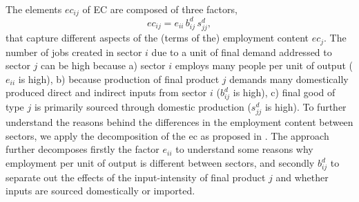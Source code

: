 \documentclass[12pt,english]{article}
\begin{document}
The elements $ec_{ij}$ of EC are composed of three factors, 
\begin{equation}ec_{ij} = e_{ii} \, b^d_{ij} \, s^d_{jj}, \label{EC_decomp}\end{equation}
that capture different aspects of the (terms of the) employment content $ec_j$. The number of jobs created in sector $i$ due to a unit of final demand addressed to sector $j$ can be high because a) sector $i$ employs many people per unit of output ($e_{ii}$ is high), b) because production of final product $j$ demands many domestically produced direct and indirect inputs from sector $i$ ($b^d_{ij}$ is high), c) final good of type $j$ is primarily sourced through domestic production ($s^d_{jj}$ is high). To further understand the reasons behind the differences in the employment content between sectors, we apply the decomposition of the ec as proposed in \citep{perrier2017transition}. The approach further decomposes firstly the factor $e_{ii}$ to understand some reasons why employment per unit of output is different between sectors, and secondly $b^d_{ij}$ to separate out the effects of the input-intensity of final product $j$ and whether inputs are sourced domestically or imported.
\end{document}
